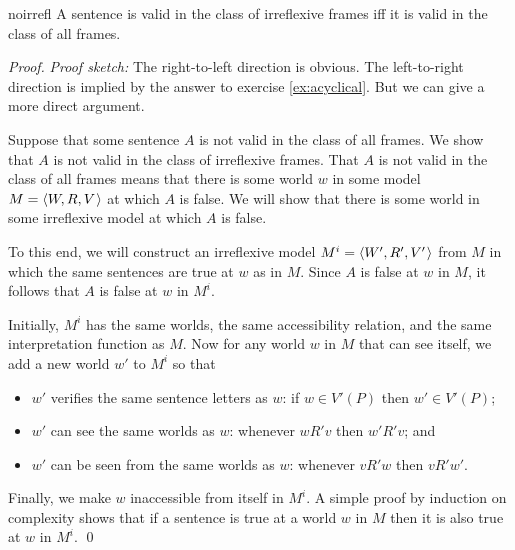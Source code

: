 \begin{observation}{noirrefl}
  A sentence is valid in the class of irreflexive frames iff it is valid in the
  class of all frames.
\end{observation}
%
\begin{proof}
  \emph{Proof sketch:} The right-to-left direction is obvious. The left-to-right direction is implied by the answer to exercise \ref{ex:acyclical}.
  But we can give a more direct argument.

  Suppose that some sentence $A$ is not valid in the class of all frames. We
  show that $A$ is not valid in the class of irreflexive frames. That $A$ is not
  valid in the class of all frames means that there is some world $w$ in some
  model $M = \t{W,R,V}$ at which $A$ is false. We will show that there is some
  world in some irreflexive model at which $A$ is false.

  To this end, we will construct an irreflexive model $M^i = \t{W',R',V'}$ from
  $M$ in which the same sentences are true at $w$ as in $M$. Since $A$ is false
  at $w$ in $M$, it follows that $A$ is false at $w$ in $M^i$.

  Initially, $M^i$ has the same worlds, the same accessibility relation, and the
  same interpretation function as $M$. Now for any world $w$ in $M$ that can see
  itself, we add a new world $w'$ to $M^i$ so that
  \begin{itemize}[leftmargin=10mm]
    \itemsep-1mm
    \item $w'$ verifies the same sentence letters as $w$: if $w \in V'(P)$ then $w' \in V'(P)$;
    \item $w'$ can see the same worlds as $w$: whenever $wR'v$ then $w'R'v$; and
    \item $w'$ can be seen from the same worlds as $w$: whenever $vR'w$ then
          $vR'w'$.
  \end{itemize}
  Finally, we make $w$ inaccessible from itself in $M^i$. A simple proof
  by induction on complexity shows that if a sentence is true at a
  world $w$ in $M$ then it is also true at $w$ in $M^i$.
  \qed

\end{proof}

